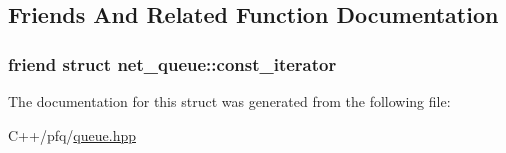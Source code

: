 \subsection{Friends And Related Function Documentation}
\subsubsection[{\texorpdfstring{net\+\_\+queue\+::const\+\_\+iterator}{net_queue::const_iterator}}]{\setlength{\rightskip}{0pt plus 5cm}friend struct {\bf net\+\_\+queue\+::const\+\_\+iterator}\hspace{0.3cm}{\ttfamily [friend]}}\hypertarget{structpfq_1_1net__queue_1_1iterator_a0fa1c59b5fb1d453f45032bc7a6ea3b0}{}\label{structpfq_1_1net__queue_1_1iterator_a0fa1c59b5fb1d453f45032bc7a6ea3b0}


The documentation for this struct was generated from the following file\+:\begin{DoxyCompactItemize}
\item 
C++/pfq/\hyperlink{queue_8hpp}{queue.\+hpp}\end{DoxyCompactItemize}
